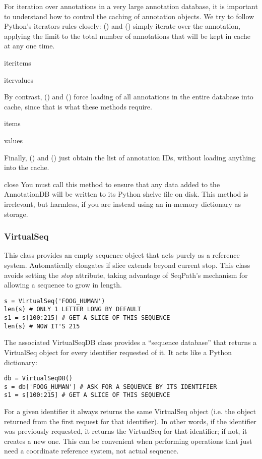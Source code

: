 \documentclass{howto}
\begin{document}
For iteration over annotations in a very large annotation database, it is
important to understand how to control the caching of annotation objects.
We try to follow Python's iterators rules closely: ()
and () simply iterate over the annotation, applying
the  limit to the total number of annotations that will be
kept in cache at any one time.  
\begin{funcdesc}{iteritems}{}
\end{funcdesc}
\begin{funcdesc}{itervalues}{}
\end{funcdesc}
By contrast, () and ()
force loading of all annotations in the entire database into cache, since
that is what these methods require.
\begin{funcdesc}{items}{}
\end{funcdesc}
\begin{funcdesc}{values}{}
\end{funcdesc}
Finally, () and () just obtain the 
list of annotation IDs, without loading anything into the cache.

\begin{funcdesc}{close}{}
  You must call this method to ensure that any data added to the AnnotationDB
  will be written to its Python shelve file on disk.
  This method is irrelevant, but harmless,
  if you are instead using an in-memory dictionary as storage.
\end{funcdesc}

\subsubsection{VirtualSeq}
This class provides an empty sequence object that
acts purely as a reference system.
Automatically elongates if slice extends beyond current stop.
This class avoids setting the {\em stop} attribute, taking advantage
of SeqPath's mechanism for allowing a sequence to grow in length.
\begin{verbatim}
s = VirtualSeq('FOOG_HUMAN')
len(s) # ONLY 1 LETTER LONG BY DEFAULT
s1 = s[100:215] # GET A SLICE OF THIS SEQUENCE
len(s) # NOW IT'S 215
\end{verbatim}

The associated VirtualSeqDB class provides a ``sequence database''
that returns a VirtualSeq object for every identifier requested of
it.  It acts like a Python dictionary:
\begin{verbatim}
db = VirtualSeqDB()
s = db['FOOG_HUMAN'] # ASK FOR A SEQUENCE BY ITS IDENTIFIER
s1 = s[100:215] # GET A SLICE OF THIS SEQUENCE
\end{verbatim}
For a given identifier it always returns the same VirtualSeq
object (i.e. the object returned from the first request for that identifier).
In other words, if the identifier was previously requested,
it returns the VirtualSeq for that identifier; if not, it 
creates a new one.
This can be convenient when performing operations that just
need a coordinate reference system, not actual sequence.
\end{document}
